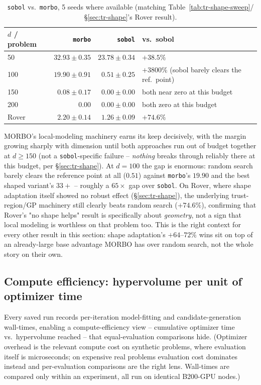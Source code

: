 \documentclass[11pt]{article}
\begin{document}
\begin{table}[h]
\centering
\caption{\texttt{sobol} vs.\ \texttt{morbo}, 5 seeds where available (matching
Table~\ref{tab:tr-shape-sweep}/\S\ref{sec:tr-shape}'s Rover result).}
\label{tab:tr-shape-sobol}
\begin{tabular}{lrrl}
\toprule
$d$ / problem & \texttt{morbo} & \texttt{sobol} & vs.\ sobol \\
\midrule
50  & $32.93\pm0.35$ & $23.78\pm0.34$ & $+38.5\%$ \\
100 & $19.90\pm0.91$ & $0.51\pm0.25$ & $+3800\%$ (sobol barely clears the ref.\ point) \\
150 & $0.08\pm0.17$ & $0.00\pm0.00$ & both near zero at this budget \\
200 & $0.00$ & $0.00\pm0.00$ & both zero at this budget \\
Rover & $2.20\pm0.14$ & $1.26\pm0.09$ & $+74.6\%$ \\
\bottomrule
\end{tabular}
\end{table}

MORBO's local-modeling machinery earns its keep decisively, with the
margin growing sharply with dimension until both approaches run out of
budget together at $d{\ge}150$ (not a \texttt{sobol}-specific failure --
\emph{nothing} breaks through reliably there at this budget, per
\S\ref{sec:tr-shape}). At $d{=}100$ the gap is enormous: random search
barely clears the reference point at all ($0.51$) against \texttt{morbo}'s
$19.90$ and the best shaped variant's $33{+}$ -- roughly a $65\times$ gap
over \texttt{sobol}. On Rover, where shape adaptation itself showed no
robust effect (\S\ref{sec:tr-shape}), the underlying trust-region/GP
machinery still clearly beats random search ($+74.6\%$), confirming that
Rover's "no shape helps" result is specifically about \emph{geometry}, not
a sign that local modeling is worthless on that problem too. This is the
right context for every other result in this section: shape adaptation's
$+64$--$72\%$ wins sit on top of an already-large base advantage MORBO has
over random search, not the whole story on their own.

\subsection{Compute efficiency: hypervolume per unit of optimizer time}

Every saved run records per-iteration model-fitting and
candidate-generation wall-times, enabling a compute-efficiency view --
cumulative optimizer time vs.\ hypervolume reached -- that equal-evaluation
comparisons hide. (Optimizer overhead is the relevant compute cost on
synthetic problems, where evaluation itself is microseconds; on expensive
real problems evaluation cost dominates instead and per-evaluation
comparisons are the right lens. Wall-times are compared only within an
experiment, all run on identical B200-GPU nodes.)
\end{document}
